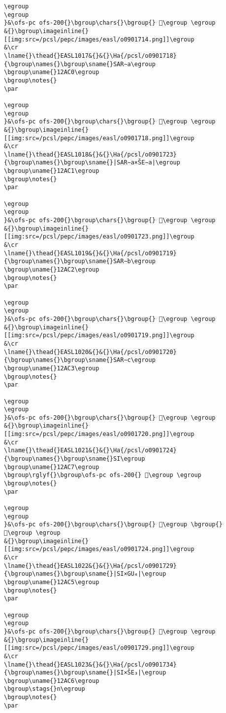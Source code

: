 \begin{verbatim}
\egroup
\egroup
}&\ofs-pc ofs-200{}\bgroup\chars{}\bgroup{} 𒪿\egroup \egroup
&{}\bgroup\imageinline{}[[img:src=/pcsl/pepc/images/easl/o0901714.png]]\egroup
&\cr
\lname{}\thead{}EASL1017&{}&{}\Ha{/pcsl/o0901718}{\bgroup\names{}\bgroup\sname{}SAR∼a\egroup
\bgroup\uname{}12AC0\egroup
\bgroup\notes{}
\par 

\egroup
\egroup
}&\ofs-pc ofs-200{}\bgroup\chars{}\bgroup{} 𒫀\egroup \egroup
&{}\bgroup\imageinline{}[[img:src=/pcsl/pepc/images/easl/o0901718.png]]\egroup
&\cr
\lname{}\thead{}EASL1018&{}&{}\Ha{/pcsl/o0901723}{\bgroup\names{}\bgroup\sname{}|SAR∼a×ŠE∼a|\egroup
\bgroup\uname{}12AC1\egroup
\bgroup\notes{}
\par 

\egroup
\egroup
}&\ofs-pc ofs-200{}\bgroup\chars{}\bgroup{} 𒫁\egroup \egroup
&{}\bgroup\imageinline{}[[img:src=/pcsl/pepc/images/easl/o0901723.png]]\egroup
&\cr
\lname{}\thead{}EASL1019&{}&{}\Ha{/pcsl/o0901719}{\bgroup\names{}\bgroup\sname{}SAR∼b\egroup
\bgroup\uname{}12AC2\egroup
\bgroup\notes{}
\par 

\egroup
\egroup
}&\ofs-pc ofs-200{}\bgroup\chars{}\bgroup{} 𒫂\egroup \egroup
&{}\bgroup\imageinline{}[[img:src=/pcsl/pepc/images/easl/o0901719.png]]\egroup
&\cr
\lname{}\thead{}EASL1020&{}&{}\Ha{/pcsl/o0901720}{\bgroup\names{}\bgroup\sname{}SAR∼c\egroup
\bgroup\uname{}12AC3\egroup
\bgroup\notes{}
\par 

\egroup
\egroup
}&\ofs-pc ofs-200{}\bgroup\chars{}\bgroup{} 𒫃\egroup \egroup
&{}\bgroup\imageinline{}[[img:src=/pcsl/pepc/images/easl/o0901720.png]]\egroup
&\cr
\lname{}\thead{}EASL1021&{}&{}\Ha{/pcsl/o0901724}{\bgroup\names{}\bgroup\sname{}SI\egroup
\bgroup\uname{}12AC7\egroup
\bgroup\rglyf{}\bgroup\ofs-pc ofs-200{} 𒫇\egroup \egroup
\bgroup\notes{}
\par 

\egroup
\egroup
}&\ofs-pc ofs-200{}\bgroup\chars{}\bgroup{} 𒫄\egroup \bgroup{} 𒫇\egroup \egroup
&{}\bgroup\imageinline{}[[img:src=/pcsl/pepc/images/easl/o0901724.png]]\egroup
&\cr
\lname{}\thead{}EASL1022&{}&{}\Ha{/pcsl/o0901729}{\bgroup\names{}\bgroup\sname{}|SI×GU₄|\egroup
\bgroup\uname{}12AC5\egroup
\bgroup\notes{}
\par 

\egroup
\egroup
}&\ofs-pc ofs-200{}\bgroup\chars{}\bgroup{} 𒫅\egroup \egroup
&{}\bgroup\imageinline{}[[img:src=/pcsl/pepc/images/easl/o0901729.png]]\egroup
&\cr
\lname{}\thead{}EASL1023&{}&{}\Ha{/pcsl/o0901734}{\bgroup\names{}\bgroup\sname{}|SI×ŠE₃|\egroup
\bgroup\uname{}12AC6\egroup
\bgroup\stags{}n\egroup
\bgroup\notes{}
\par 


\end{verbatim}
